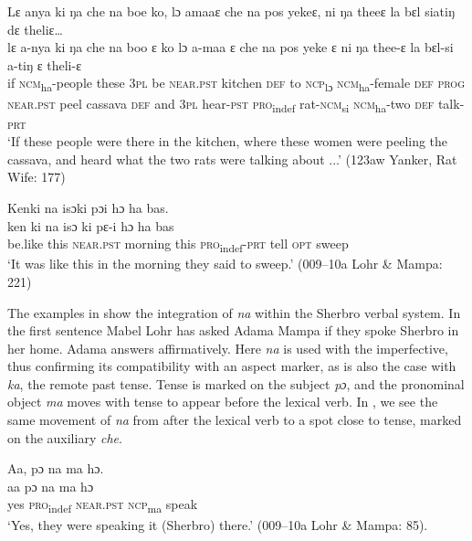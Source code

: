 \ex \label{ex:121b} Lɛ anya ki ŋa che na boe ko, lɔ amaaɛ che na pos yekeɛ, ni ŋa theeɛ la bɛl siatiŋ dɛ theliɛ…\\
    \gll lɛ  a-nya        ki    ŋa    che  na        boo    ɛ    ko lɔ    a-maa      ɛ    che  na        pos  yeke    ɛ ni    ŋa    thee-ɛ    la      bɛl-si      a-tiŋ      ɛ    theli-ɛ\\
    if  \textsc{ncm}\textsubscript{ha}{}-people  these  \textsc{3pl}  be    \textsc{near.pst}  kitchen  \textsc{def}   to  \textsc{ncp}\textsubscript{lɔ}  \textsc{ncm}\textsubscript{ha}{}-female  \textsc{def}  \textsc{prog}  \textsc{near.pst}  peel  cassava  \textsc{def} and  \textsc{3pl}  hear-\textsc{pst}    \textsc{pro}\textsubscript{indef}  rat-\textsc{ncm}\textsubscript{si}  \textsc{ncm}\textsubscript{ha}-two  \textsc{def}  talk-\textsc{prt}\\
    \glt ‘If these people were there in the kitchen, where these women were peeling the cassava, and heard what the two rats were talking about ...' (123aw Yanker, Rat Wife: 177)

\ex \label{ex:121c} Kenki na isɔki pɔi hɔ ha bas.\\
    \gll ken    ki    na        isɔ        ki    pɛ{}-i      hɔ    ha    bas\\
    be.like  this  \textsc{near.pst}  morning    this  \textsc{pro}\textsubscript{indef}\textsc{{}-prt}  tell  \textsc{opt}  sweep\\
    \glt ‘It was like this in the morning they said to sweep.' (009--10a Lohr \& Mampa: 221)
\z
\z

The examples in  show the integration of \textit{na} within the Sherbro verbal system. In the first sentence Mabel Lohr has asked Adama Mampa if they spoke Sherbro in her home. Adama answers affirmatively. Here \textit{na} is used with the imperfective, thus confirming its compatibility with an aspect marker, as is also the case with \textit{ka}, the remote past tense. Tense is marked on the subject \textit{pɔ}, and the pronominal object \textit{ma} moves with tense to appear before the lexical verb. In , we see the same movement of \textit{na} from after the lexical verb to a spot close to tense, marked on the auxiliary \textit{che}.

\ea%
    \label{ex:122}
    \ea \label{ex:122a} Aa, pɔ na ma hɔ.\\
    \gll aa    pɔ      na        ma    hɔ\\
    yes  \textsc{pro}\textsubscript{indef}  \textsc{near.pst}  \textsc{ncp}\textsubscript{ma}    speak\\
    \glt ‘Yes, they were speaking it (Sherbro) there.' (009--10a Lohr \& Mampa: 85).

